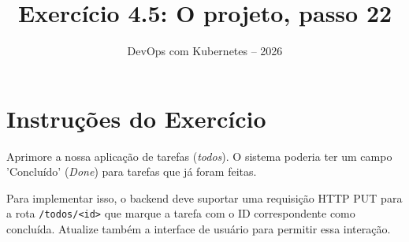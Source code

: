 \documentclass[11pt,a4paper]{article}
\title{\color{secondary}\Huge\textbf{Exercício 4.5: O projeto, passo 22}}
\author{\color{primary}DevOps com Kubernetes -- 2026}
\date{}
\begin{document}
\maketitle

\section*{\color{primary}Instruções do Exercício}
\begin{tcolorbox}[colback=blue!5!white,colframe=blue!75!black,title=Exercício 4.5: O projeto, passo 22]
Aprimore a nossa aplicação de tarefas (\textit{todos}). O sistema poderia ter um campo 'Concluído' (\textit{Done}) para tarefas que já foram feitas.

Para implementar isso, o backend deve suportar uma requisição HTTP PUT para a rota \texttt{/todos/<id>} que marque a tarefa com o ID correspondente como concluída. Atualize também a interface de usuário para permitir essa interação.
\end{tcolorbox}
\end{document}
